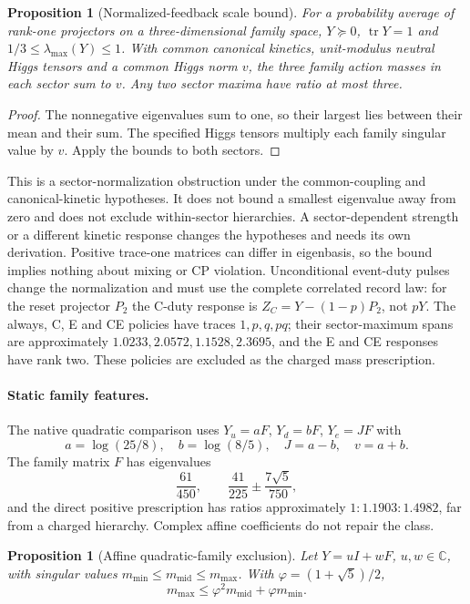 \documentclass[11pt]{article}
\newtheorem{proposition}[theorem]{Proposition}
\begin{document}
\begin{proposition}[Normalized-feedback scale bound]
\label{prop:trace-one}
For a probability average of rank-one projectors on a three-dimensional
family space, \(Y\succeq0\), \(\operatorname{tr}Y=1\) and
\(1/3\le\lambda_{\max}(Y)\le1\). With common canonical kinetics,
unit-modulus neutral Higgs tensors and a common Higgs norm \(v\), the three
family action masses in each sector sum to \(v\). Any two sector maxima
have ratio at most three.
\end{proposition}

\begin{proof}
The nonnegative eigenvalues sum to one, so their largest lies between their
mean and their sum. The specified Higgs tensors multiply each family
singular value by \(v\). Apply the bounds to both sectors.
\end{proof}

This is a sector-normalization obstruction under the common-coupling and
canonical-kinetic hypotheses. It does not bound a smallest eigenvalue away
from zero and does not exclude within-sector hierarchies. A
sector-dependent strength or a different kinetic response changes the
hypotheses and needs its own derivation. Positive trace-one matrices can
differ in eigenbasis, so the bound implies nothing about mixing or CP
violation. Unconditional event-duty pulses change the normalization and must
use the complete correlated record law: for the reset projector \(P_2\) the
C-duty response is \(Z_C=Y-(1-p)P_2\), not \(pY\). The always, C, E and CE
policies have traces \(1,p,q,pq\); their sector-maximum spans are
approximately \(1.0233,2.0572,1.1528,2.3695\), and the E and CE responses
have rank two. These policies are excluded as the charged mass prescription.

\paragraph{Static family features.}
The native quadratic comparison uses \(Y_u=aF\), \(Y_d=bF\), \(Y_e=JF\) with
\[
 a=\log(25/8),\quad b=\log(8/5),\quad J=a-b,\quad v=a+b .
\]
The family matrix \(F\) has eigenvalues
\[
 \frac{61}{450},\qquad\frac{41}{225}\pm\frac{7\sqrt5}{750},
\]
and the direct positive prescription has ratios approximately
\(1:1.1903:1.4982\), far from a charged hierarchy. Complex affine
coefficients do not repair the class.

\begin{proposition}[Affine quadratic-family exclusion]
\label{prop:affine-exclusion}
Let \(Y=uI+wF\), \(u,w\in\mathbb C\), with singular values
\(m_{\min}\le m_{\mathrm{mid}}\le m_{\max}\). With \(\varphi=(1+\sqrt5)/2\),
\[
 m_{\max}\le\varphi^2m_{\mathrm{mid}}+\varphi m_{\min}.
\]
\end{proposition}
\end{document}
